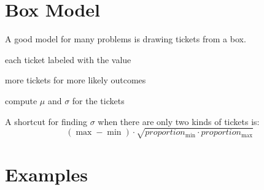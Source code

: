 \documentclass[letterpaper,landscape]{exam}
\begin{document}
  \section{Box Model}
  A good model for many problems is drawing tickets from a box.
  \begin{itemize*}
    \item each ticket labeled with the value
    \item more tickets for more likely outcomes
    \item compute $\mu$ and $\sigma$ for the tickets
  \end{itemize*}

  A shortcut for finding $\sigma$ when there are only two kinds of tickets is:
  \[
    (\max - \min) \cdot \sqrt{proportion_{\min} \cdot proportion_{\max}}
  \]

  \section{Examples}
\end{document}
